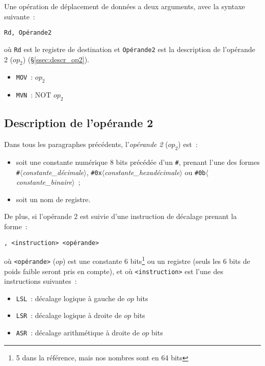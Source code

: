 \documentclass[11pt,a4paper]{article}
\begin{document}
Une opération de déplacement de données a deux arguments, avec la syntaxe suivante~:

\begin{center}\texttt{Rd, Opérande2}\end{center}

où \texttt{Rd} est le registre de destination et \texttt{Opérande2} est la description de l'opérande 2 ($op_2$) (§\ref{ssec:descr_op2}).

\begin{itemize}
\item \texttt{MOV}~: $op_2$
\item \texttt{MVN}~: $\text{NOT } op_2$
\end{itemize}

\subsection*{Description de l'opérande 2}\label{ssec:descr_op2}

Dans tous les paragraphes précédents, l'\emph{opérande 2} ($op_2$) est~:

\begin{itemize}
\item soit une constante numérique 8 bits précédée d'un \texttt{\#}, prenant l'une des formes \texttt{\#}$\langle$\textit{constante\_{}décimale}$\rangle$, \texttt{\#{}0x}$\langle$\textit{constante\_{}hexadécimale}$\rangle$ ou \texttt{\#{}0b}$\langle$\textit{constante\_{}binaire}$\rangle$~;
\item soit un nom de registre.
\end{itemize}

De plus, si l'opérande 2 est suivie d'une instruction de décalage prenant la forme~:

\begin{center}\texttt{, <instruction> <opérande>}\end{center}

où \texttt{<opérande>} ($op$) est une constante 6 bits\footnote{5 dans la référence, mais nos nombres sont en 64 bits} ou un registre (seuls les 6 bits de poids faible seront pris en compte), et où \texttt{<instruction>} est l'une des instructions suivantes~:
\begin{itemize}
\item \texttt{LSL}~: décalage logique à gauche de $op$ bits
\item \texttt{LSR}~: décalage logique à droite de $op$ bits
\item \texttt{ASR}~: décalage arithmétique à droite de $op$ bits
\end{itemize}
\end{document}
